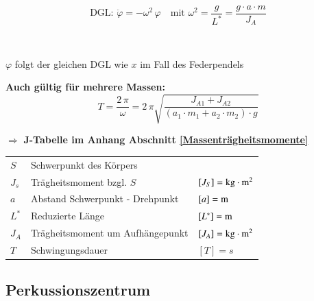 \begin{minipage}{0.66\linewidth}

\\




$$ \boxed{ \text{DGL: } \ddot{\varphi} = -\omega^2 \, \varphi  \quad \text{mit } \omega^2 =  \frac{g}{L^*} = \frac{g \cdot a \cdot m}{J_A}  }$$

 \\

\vspace{0.2cm}

$\varphi$ folgt der gleichen DGL wie $x$ im Fall des Federpendels \\

\end{minipage}

\textbf{Auch gültig für mehrere Massen:}
$$ \boxed{  T = \frac{2 \, \pi}{\omega} = 2 \, \pi \sqrt{\frac{J_{A1} + J_{A2}}{(a_1 \cdot m_1 + a_2 \cdot m_2) \cdot g}} } $$

$\boldsymbol{ \Rightarrow} $ \textbf{J-Tabelle im Anhang Abschnitt \ref{Massenträgheitsmomente}} \\



\begin{tabular}{lll}
$S$ &  Schwerpunkt des Körpers &  \\
$J_s$ & Trägheitsmoment bzgl. $S$ & $[J_S] = \mathrm{kg} \cdot \mathrm{m}^2$ \\
$a$ & Abstand Schwerpunkt - Drehpunkt & $[a] = \mathrm{m}$ \\
$L^*$ & Reduzierte Länge & $[L^*] = \mathrm{m}$ \\
$J_A$ & Trägheitsmoment um Aufhängepunkt & $[J_A] = \mathrm{kg} \cdot \mathrm{m}^2$ \\
$T$ & Schwingungsdauer & $[T] = s $ \\
\end{tabular}



\subsection{Perkussionszentrum}


